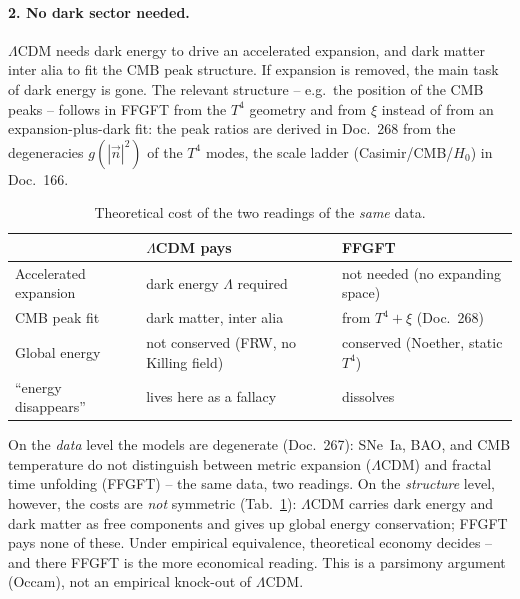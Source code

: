 \paragraph{2. No dark sector needed.}
$\Lambda$CDM needs dark energy to drive an accelerated expansion, and dark
matter inter alia to fit the CMB peak structure. If expansion is removed, the
main task of dark energy is gone. The relevant structure -- e.g.\ the position
of the CMB peaks -- follows in FFGFT from the $T^4$ geometry and from $\xi$
instead of from an expansion-plus-dark fit: the peak ratios are derived in
Doc.~268 from the degeneracies $g(|\vec n|^2)$ of the $T^4$ modes, the scale
ladder (Casimir/CMB/$H_0$) in Doc.~166.

\begin{table}[ht]
\centering
\caption{Theoretical cost of the two readings of the \emph{same} data.}
\label{tab:cost277}
\begin{tabular}{@{}lll@{}}
\toprule
 & $\Lambda$CDM pays & FFGFT \\
\midrule
Accelerated expansion & dark energy $\Lambda$ required &
  not needed (no expanding space) \\
CMB peak fit & dark matter, inter alia &
  from $T^4+\xi$ (Doc.~268) \\
Global energy & not conserved (FRW, no Killing field) &
  conserved (Noether, static $T^4$) \\
\enquote{energy disappears} & lives here as a fallacy &
  dissolves \\
\bottomrule
\end{tabular}
\end{table}

\begin{warnthm}\label{warn:degeneracy277}
On the \emph{data} level the models are degenerate (Doc.~267): SNe~Ia, BAO, and
CMB temperature do not distinguish between metric expansion ($\Lambda$CDM) and
fractal time unfolding (FFGFT) -- the same data, two readings. On the
\emph{structure} level, however, the costs are \emph{not} symmetric
(Tab.~\ref{tab:cost277}): $\Lambda$CDM carries dark energy and dark matter as
free components and gives up global energy conservation; FFGFT pays none of
these. Under empirical equivalence, theoretical economy decides -- and there
FFGFT is the more economical reading. This is a parsimony argument (Occam), not
an empirical knock-out of $\Lambda$CDM.
\end{warnthm}

